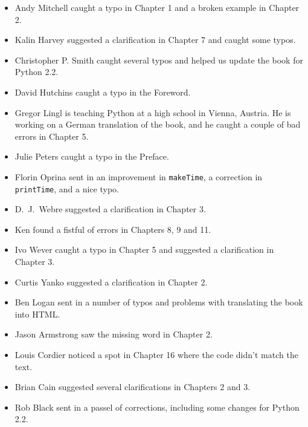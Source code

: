 \documentclass[10pt]{book}
\begin{document}
\begin{CJK}{UTF8}{gbsn}
\begin{itemize}
\item Andy Mitchell caught a typo in Chapter 1 and a broken example
in Chapter 2.

\item Kalin Harvey suggested a clarification in Chapter 7 and
caught some typos.

\item Christopher P. Smith caught several typos and helped us
update the book for Python 2.2.

\item David Hutchins caught a typo in the Foreword.

\item Gregor Lingl is teaching Python at a high school in Vienna,
Austria.  He is working on a German translation of the book,
and he caught a couple of bad errors in Chapter 5.

\item Julie Peters caught a typo in the Preface.

\item Florin Oprina sent in an improvement in {\tt makeTime},
a correction in {\tt printTime}, and a nice typo.

\item D.~J.~Webre suggested a clarification in Chapter 3.

\item Ken found a fistful of errors in Chapters 8, 9 and 11.

\item Ivo Wever caught a typo in Chapter 5 and suggested a clarification
in Chapter 3.

\item Curtis Yanko suggested a clarification in Chapter 2.

\item Ben Logan sent in a number of typos and problems with translating
the book into HTML.

\item Jason Armstrong saw the missing word in Chapter 2.

\item Louis Cordier noticed a spot in Chapter 16 where the code
didn't match the text.

\item Brian Cain suggested several clarifications in Chapters 2 and 3.

\item Rob Black sent in a passel of corrections, including some
changes for Python 2.2.


\end{itemize}
\end{CJK}
\end{document}
